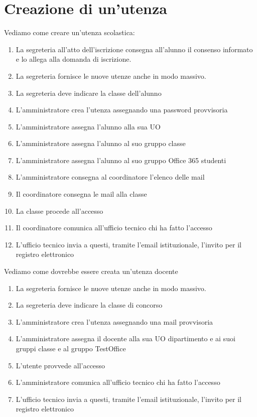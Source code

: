 \section{Creazione di un'utenza}
Vediamo come creare un'utenza scolastica:
\begin{enumerate}
	\item La segreteria all'atto dell'iscrizione consegna all'alunno il consenso
	informato e lo allega alla domanda di iscrizione.
	\item La segreteria fornisce le nuove utenze anche in modo massivo.
	\item La segreteria deve indicare la classe dell'alunno
	\item L'amministratore crea l'utenza assegnando una password provvisoria
	\item L'amministratore assegna l'alunno alla sua UO
	\item L'amministratore assegna l'alunno al suo gruppo classe
	\item L'amministratore assegna l'alunno al suo gruppo Office 365 studenti
	\item L'amministratore consegna al coordinatore l'elenco delle mail
	\item Il coordinatore  consegna le mail alla classe 
	\item La classe procede all'accesso
	\item Il coordinatore comunica all'ufficio tecnico chi ha fatto l'accesso
	\item L'ufficio tecnico invia  a questi, tramite l'email istituzionale, 
	l'invito  per il registro elettronico
\end{enumerate}
Vediamo come dovrebbe essere creata un'utenza docente
\begin{enumerate}
	\item La segreteria fornisce le nuove utenze anche in modo massivo.
	\item La segreteria deve indicare la classe di concorso
	\item L'amministratore crea l'utenza assegnando una mail provvisoria
	\item L'amministratore assegna il docente alla sua UO dipartimento e ai suoi 
	gruppi  classe e al gruppo TestOffice
	\item L'utente provvede all'accesso
	\item L'amministratore  comunica all'ufficio tecnico chi ha fatto l'accesso
	\item L'ufficio tecnico invia  a questi, tramite l'email istituzionale, 
	l'invito  per il registro elettronico
\end{enumerate}
